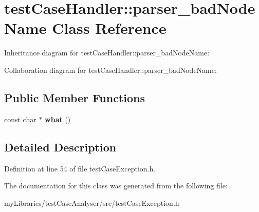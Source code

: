\hypertarget{classtestCaseHandler_1_1parser__badNodeName}{}\section{test\+Case\+Handler\+::parser\+\_\+bad\+Node\+Name Class Reference}
\label{classtestCaseHandler_1_1parser__badNodeName}


Inheritance diagram for test\+Case\+Handler\+::parser\+\_\+bad\+Node\+Name\+:


Collaboration diagram for test\+Case\+Handler\+::parser\+\_\+bad\+Node\+Name\+:
\subsection*{Public Member Functions}
\begin{DoxyCompactItemize}
\item 
\mbox{\label{classtestCaseHandler_1_1parser__badNodeName_ac291611884b14d120c97401d034d603e}} 
const char $\ast$ {\bfseries what} ()
\end{DoxyCompactItemize}


\subsection{Detailed Description}


Definition at line 54 of file test\+Case\+Exception.\+h.



The documentation for this class was generated from the following file\+:\begin{DoxyCompactItemize}
\item 
my\+Libraries/test\+Case\+Analyser/src/test\+Case\+Exception.\+h\end{DoxyCompactItemize}
